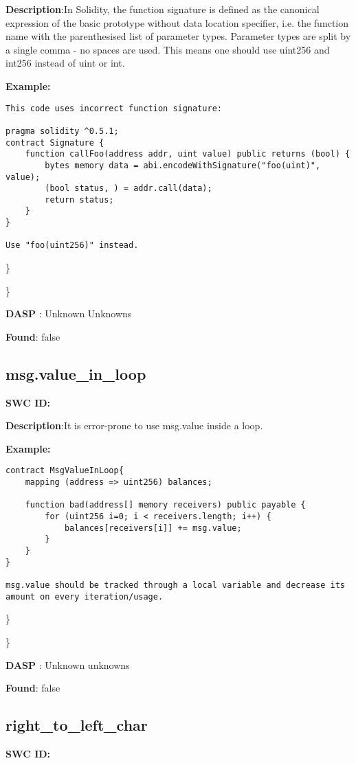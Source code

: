 \documentclass{article}
\begin{document}
\textbf{Description}:In Solidity, the function signature is defined as the canonical expression of the basic prototype without data location specifier, i.e. the function name with the parenthesised list of parameter types. Parameter types are split by a single comma - no spaces are used. This means one should use uint256 and int256 instead of uint or int.


\textbf{Example:} 
\begin{verbatim}
This code uses incorrect function signature:

pragma solidity ^0.5.1;
contract Signature {
    function callFoo(address addr, uint value) public returns (bool) {
        bytes memory data = abi.encodeWithSignature("foo(uint)", value);
        (bool status, ) = addr.call(data);
        return status;
    }
}

Use "foo(uint256)" instead.

\end{verbatim}\} 

\} 

\textbf{DASP} : Unknown Unknowns

\textbf{Found}: false

\subsection{msg.value\_in\_loop} 
\textbf{SWC \textunderscore ID:} 

\textbf{Description}:It is error-prone to use msg.value inside a loop.


\textbf{Example:} 
\begin{verbatim}
contract MsgValueInLoop{
    mapping (address => uint256) balances;

    function bad(address[] memory receivers) public payable {
        for (uint256 i=0; i < receivers.length; i++) {
            balances[receivers[i]] += msg.value;
        }
    }
}

msg.value should be tracked through a local variable and decrease its amount on every iteration/usage.

\end{verbatim}\} 

\} 

\textbf{DASP} : Unknown unknowns

\textbf{Found}: false

\subsection{right\_to\_left\_char} 
\textbf{SWC \textunderscore ID:} 
\end{document}
